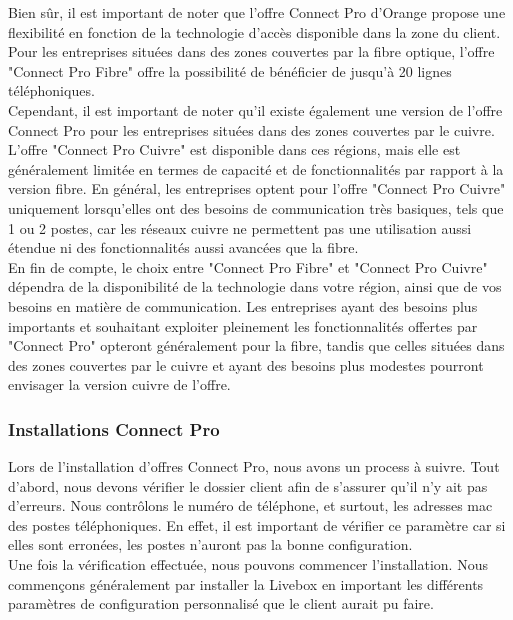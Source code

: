 \documentclass[12pt, a4paper]{article}
\begin{document}
Bien sûr, il est important de noter que l'offre
Connect Pro d'Orange propose une flexibilité en
fonction de la technologie d'accès disponible dans
la zone du client. Pour les entreprises situées dans des
zones couvertes par la fibre optique, l'offre
"Connect Pro Fibre" offre la possibilité de
bénéficier de jusqu'à 20 lignes téléphoniques.\\

Cependant, il est important de noter qu'il
existe également une version de l'offre Connect Pro
pour les entreprises situées dans des zones
couvertes par le cuivre. L'offre "Connect Pro Cuivre"
est disponible dans ces régions, mais elle est
généralement limitée en termes de capacité et de
fonctionnalités par rapport à la version fibre.
En général, les entreprises optent pour l'offre
"Connect Pro Cuivre" uniquement lorsqu'elles ont
des besoins de communication très basiques, tels
que 1 ou 2 postes, car les réseaux
cuivre ne permettent pas une utilisation aussi
étendue ni des fonctionnalités aussi avancées 
que la fibre.\\

En fin de compte, le choix entre "Connect Pro
Fibre" et "Connect Pro Cuivre" dépendra de la
disponibilité de la technologie dans votre région,
ainsi que de vos besoins en matière de communication.
Les entreprises ayant des besoins plus importants
et souhaitant exploiter pleinement les fonctionnalités
offertes par "Connect Pro" opteront généralement
pour la fibre, tandis que celles situées dans des
zones couvertes par le cuivre et ayant des besoins
plus modestes pourront envisager la version cuivre
de l'offre.
\par\endgroup

\newpage
\subsubsection{Installations Connect Pro}
Lors de l'installation d'offres Connect Pro, nous
avons un process à suivre. Tout d'abord, nous devons
vérifier le dossier client afin de s'assurer 
qu'il n'y ait pas d'erreurs. Nous contrôlons 
le numéro de téléphone, et surtout, les adresses 
mac des postes téléphoniques. En effet, il est
important de vérifier ce paramètre car si elles 
sont erronées, les postes n'auront pas 
la bonne configuration.\\

Une fois la vérification effectuée, nous pouvons
commencer l'installation. Nous commençons généralement 
par installer la Livebox en important les différents 
paramètres de configuration personnalisé que le client 
aurait pu faire.\\
\end{document}
